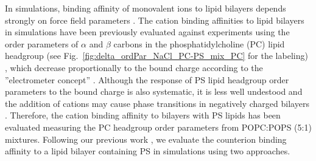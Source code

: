 \documentclass[journal=jpcbfk,manuscript=article]{achemso}
\begin{document}
In simulations, binding affinity of monovalent ions to lipid bilayers depends strongly on
force field parameters \cite{catte16,NMRlipidsIV}.
The cation binding affinities to lipid bilayers in simulations have been previously evaluated
against experiments using the order parameters of $\alpha$ and $\beta$ carbons in the
phosphatidylcholine (PC) lipid headgroup (see Fig.~\ref{fig:delta_ordPar_NaCl_PC-PS_mix_PC} for the labeling) \cite{catte16,melcr18,NMRlipidsIV},
which decrease proportionally to the bound charge according to the ''electrometer concept'' \citep{seelig87}.
Although the response of PS lipid headgroup order parameters to the bound charge is also systematic,
it is less well undestood and the addition of cations may cause phase transitions in negatively charged
bilayers \cite{feigenson86,mattai89,roux91,roux90}. Therefore, the cation binding affinity to bilayers with
PS lipids has been evaluated measuring the PC headgroup order parameters from POPC:POPS (5:1)
mixtures\cite{roux90,NMRlipidsIV}.
Following our previous work \cite{NMRlipidsIV}, we evaluate the counterion binding affinity
to a lipid bilayer containing PS in simulations using two approaches.

 
\end{document}
